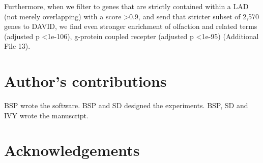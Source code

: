 \documentclass[10pt]{bmc_article}
\newenvironment{bmcformat}{\baselineskip20pt\sloppy\setboolean{publ}{false}}{\baselineskip20pt\sloppy}
\begin{document}
\begin{bmcformat}
Furthermore, when we filter to genes that are strictly contained within a LAD (not merely overlapping) with a score \textgreater 0.9, and send that stricter subset of 2,570 genes to DAVID, we find even stronger enrichment of olfaction and related terms (adjusted p \textless  1e-106), g-protein coupled recepter (adjusted p \textless  1e-95) (Additional File 13).



\bigskip

\section*{Author's contributions}
BSP wrote the software. BSP and SD designed the experiments. BSP, SD and IVY wrote the manuscript.
    

\section*{Acknowledgements}
 

\newpage
{
   }     %


\end{bmcformat}
\end{document}
